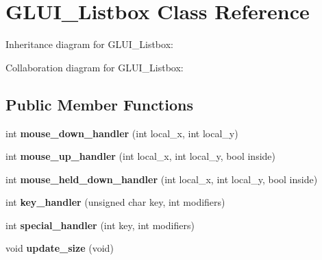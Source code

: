 \hypertarget{class_g_l_u_i___listbox}{\section{G\+L\+U\+I\+\_\+\+Listbox Class Reference}
\label{class_g_l_u_i___listbox}
}


Inheritance diagram for G\+L\+U\+I\+\_\+\+Listbox\+:


Collaboration diagram for G\+L\+U\+I\+\_\+\+Listbox\+:
\subsection*{Public Member Functions}
\begin{DoxyCompactItemize}
\item 
\hypertarget{class_g_l_u_i___listbox_aaf335e290bd8367d40a9b868faa8be1c}{int {\bfseries mouse\+\_\+down\+\_\+handler} (int local\+\_\+x, int local\+\_\+y)}\label{class_g_l_u_i___listbox_aaf335e290bd8367d40a9b868faa8be1c}

\item 
\hypertarget{class_g_l_u_i___listbox_a565e196711dad776a2a6f4afa035d25a}{int {\bfseries mouse\+\_\+up\+\_\+handler} (int local\+\_\+x, int local\+\_\+y, bool inside)}\label{class_g_l_u_i___listbox_a565e196711dad776a2a6f4afa035d25a}

\item 
\hypertarget{class_g_l_u_i___listbox_a425b2552f8e430d19157410681abc91c}{int {\bfseries mouse\+\_\+held\+\_\+down\+\_\+handler} (int local\+\_\+x, int local\+\_\+y, bool inside)}\label{class_g_l_u_i___listbox_a425b2552f8e430d19157410681abc91c}

\item 
\hypertarget{class_g_l_u_i___listbox_ac3a007ee056e377322d3a8d6ad0478c4}{int {\bfseries key\+\_\+handler} (unsigned char key, int modifiers)}\label{class_g_l_u_i___listbox_ac3a007ee056e377322d3a8d6ad0478c4}

\item 
\hypertarget{class_g_l_u_i___listbox_ab1efa64fe3a73dc5d62ebc540acac2d5}{int {\bfseries special\+\_\+handler} (int key, int modifiers)}\label{class_g_l_u_i___listbox_ab1efa64fe3a73dc5d62ebc540acac2d5}

\item 
\hypertarget{class_g_l_u_i___listbox_a32bf6c1b068e2af4466a19f797693c8d}{void {\bfseries update\+\_\+size} (void)}\label{class_g_l_u_i___listbox_a32bf6c1b068e2af4466a19f797693c8d}


\end{DoxyCompactItemize}

